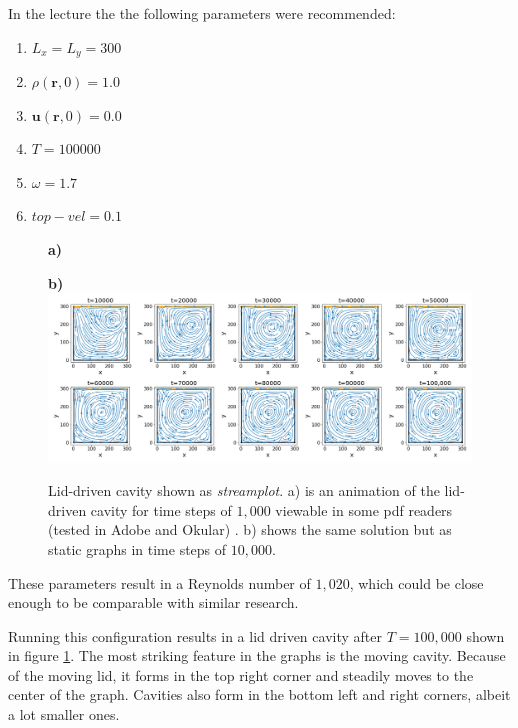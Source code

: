 \documentclass[a4paper,11pt, oneside]{book}
\begin{document}
In the lecture the the following parameters were recommended:
\begin{enumerate}
    \item $L_x = L_y = 300$
    \item $\rho(\textbf{r},0) = 1.0$
    \item $\textbf{u}(\textbf{r},0) = 0.0$
    \item $T = 100000$
    \item $\omega = 1.7$
    \item $top-vel = 0.1$
\end{enumerate}
\clearpage
\begin{figure}[ht]
\centering
\textbf{\large a)}
\vspace*{2mm}

\textbf{\large b)}
\includegraphics[width=\columnwidth]{milestones/final/img/m6-1-vels.png}
\caption[Lid-driven cavity]{Lid-driven cavity shown as \textit{streamplot}. a) is an animation of the lid-driven cavity for time steps of $1,000$ viewable in some pdf readers (tested in Adobe and Okular) . b) shows the same solution but as static graphs in time steps of $10,000$. }
\label{fig:m6-1}
\end{figure}
\clearpage
These parameters result in a Reynolds number of $1,020$, which could be close enough to be comparable with similar research.

Running this configuration results in a lid driven cavity  after $T=100,000$ shown in figure \ref{fig:m6-1}.
The most striking feature in the graphs is the moving cavity. Because of the moving lid, it forms in the top right corner and steadily moves to the center of the graph. 
Cavities also form in the bottom left and right corners, albeit a lot smaller ones. 
\end{document}
